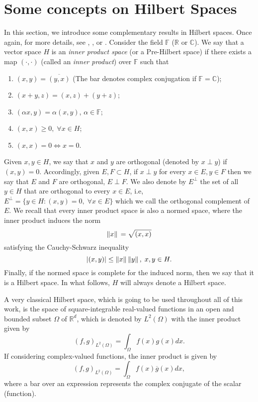 \section{Some concepts on Hilbert Spaces}
In this section, we introduce some complementary results in Hilbert spaces. Once again, for more details, see \cite{rudin1991functional}, \cite{brezis2011functional}, or \cite{arendt2010partielle}. Consider the field \(\mathbb{F}\) (\(\mathbb{R}\) or \(\mathbb{C}\)). We say that a vector space \(H\) is an \textit{inner product space} (or a Pre-Hilbert space) if there exists a map \((\cdot,\cdot)\) (called an \textit{inner product}) over \(\mathbb{F}\) such that
\begin{enumerate}
    \item \((x, y) = \overline{(y, x)}\) (The bar denotes complex conjugation if \(\mathbb{F} = \mathbb{C}\));
    \item \((x+y,z) = (x,z)+(y+z)\);
    \item \((\alpha x, y)=\alpha(x, y)\), \(\alpha \in \mathbb{F}\);
    \item \((x, x) \geq 0, \; \forall x \in H\);
    \item \((x, x) = 0 \iff x=0\).
\end{enumerate}
Given \(x, y \in H\), we say that \(x\) and \(y\) are orthogonal (denoted by \(x \perp y\)) if \((x, y) = 0\). Accordingly, given \(E, F \subset H\), if \(x\perp y\) for every \(x \in E, y \in F\) then we say that \(E\) and \(F\) are orthogonal, \(E \perp F\). We also denote by \(E^\perp\) the set of all \(y \in H\) that are orthogonal to every \(x \in E\), i.e, \(E^\perp = \{y \in H: (x, y)=0, \; \forall x \in E\}\) which we call the orthogonal complement of \(E\). We recall that every inner product space is also a normed space, where the inner product induces the norm
\[
\norm*{x} = \sqrt{(x, x)}   
\]
satisfying the Cauchy-Schwarz inequality
\[
\abs{(x, y)} \leq \norm*{x}\norm*{y}, \; x, y \in H.
\]
Finally, if the normed space is complete for the induced norm, then we say that it is a Hilbert space. In what follows, \(H\) will always denote a Hilbert space.
\begin{example}
    A very classical Hilbert space, which is going to be used throughout all of this work, is the space of square-integrable real-valued functions in an open and bounded subset \(\Omega\) of \(\mathbb{R}^d\), which is denoted by \(L^2(\Omega)\) with the inner product given by
    \[
    (f, g)_{L^2(\Omega)} = \int_\Omega f(x)g(x) dx.
    \]
    If considering complex-valued functions, the inner product is given by
    \[
        (f, g)_{L^2(\Omega)} = \int_\Omega f(x)\overline{g}(x) dx,
    \]
    where a bar over an expression represents the complex conjugate of the scalar (function).
\end{example}
